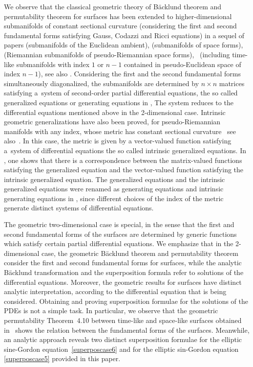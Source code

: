 \documentclass[pdftex]{sigma}
\numberwithin{equation}{section}
\begin{document}
We observe that the classical geometric theory of B\"acklund theorem and permutability theorem for surfaces has been extended to
higher-dimensional submanifolds of constant sectional curvature (considering the first and second fundamental forms satisfying Gauss, Codazzi and Ricci equations) in a sequel of papers \cite{TenenblatTerng,Terng} (submanifolds of the Euclidean ambient), \cite{Tenenblat1985} (submanifolds of space forms), \cite{BarbosaFerreiraTenenblat} (Riemannian submanifolds of pseudo-Riemannian space forms), \cite{ChenZuoCheng2004}~(including time-like submanifolds with index $1$ or $n-1$ contained in pseudo-Euclidean space of index $n-1$), see also \cite{DajczerTojeiro}. Considering the first and the second fundamental forms simultaneously diagonalized, the submanifolds are determined by $n\times n$ matrices satisfying a~system of second-order partial differential equations, the so called generalized equations or generating equations in \cite{Tenenblat1998}, The system reduces to the differential equations mentioned above in the 2-dimensional case. Intrinsic geometric generalizations have also been proved, for pseudo-Riemannian manifolds with any index, whose metric has constant sectional curvature~\cite{Campos, CamposTenenblat} see also~\cite{BealsTenenblat1991}. In this case, the metric is given by a vector-valued function satisfying a~system of differential equations the so called intrinsic generalized equations. In \cite[Theorem~2.3]{BarbosaFerreiraTenenblat},
one shows that there is a correspondence between the matrix-valued functions satisfying the generalized equation and the vector-valued function satisfying the intrinsic generalized equation. The generalized equations and the intrinsic generalized equations were renamed as generating equations and intrinsic generating equations in \cite{Tenenblat1998}, since different choices of the index of the metric generate distinct systems of differential equations.

The geometric two-dimensional case is special, in the sense that the first and second fundamental forms of the surfaces are determined by generic functions which satisfy certain partial differential equations. We emphasize that in the 2-dimensional case, the geometric B\"acklund theorem and permutability theorem consider the first and second fundamental forms for surfaces, while the analytic B\"acklund transformation and the superposition formula refer to solutions of the differential equations. Moreover, the geometric results for surfaces have distinct analytic interpretation, according to the differential equation that is being considered. Obtaining and proving superposition formulae for the solutions of the PDEs is not a simple task. In particular, we observe that the geometric permutability Theorem~4.10 between time-like and space-like surfaces obtained in~\cite{ChenZuoCheng2004}
shows the relation between the fundamental forms of the surfaces. Meanwhile, an analytic approach reveals two distinct superposition formulae for the elliptic sine-Gordon equation~\eqref{superposcase6} and for the elliptic sin-Gordon equation \eqref{superposcase5} provided in this paper.
\end{document}
